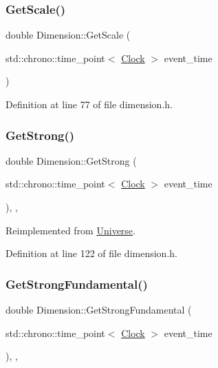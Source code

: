 \subsubsection{\texorpdfstring{Get\+Scale()}{GetScale()}}
{\footnotesize\ttfamily double Dimension\+::\+Get\+Scale (\begin{DoxyParamCaption}\item[{std\+::chrono\+::time\+\_\+point$<$ \hyperlink{universe_8h_a0ef8d951d1ca5ab3cfaf7ab4c7a6fd80}{Clock} $>$}]{event\+\_\+time }\end{DoxyParamCaption})\hspace{0.3cm}{\ttfamily [inline]}}



Definition at line 77 of file dimension.\+h.

\mbox{\label{class_dimension_ae36aadad4ae84735a5ff73bff4eb97b1}} 
\subsubsection{\texorpdfstring{Get\+Strong()}{GetStrong()}}
{\footnotesize\ttfamily double Dimension\+::\+Get\+Strong (\begin{DoxyParamCaption}\item[{std\+::chrono\+::time\+\_\+point$<$ \hyperlink{universe_8h_a0ef8d951d1ca5ab3cfaf7ab4c7a6fd80}{Clock} $>$}]{event\+\_\+time }\end{DoxyParamCaption})\hspace{0.3cm}{\ttfamily [inline]}, {\ttfamily [final]}, {\ttfamily [virtual]}}



Reimplemented from \hyperlink{class_universe_acb453ce71da418c5b5617fecede9571b}{Universe}.



Definition at line 122 of file dimension.\+h.

\mbox{\label{class_dimension_ad0d067d7f9dc4841b0ad280979ebe7af}} 
\subsubsection{\texorpdfstring{Get\+Strong\+Fundamental()}{GetStrongFundamental()}}
{\footnotesize\ttfamily double Dimension\+::\+Get\+Strong\+Fundamental (\begin{DoxyParamCaption}\item[{std\+::chrono\+::time\+\_\+point$<$ \hyperlink{universe_8h_a0ef8d951d1ca5ab3cfaf7ab4c7a6fd80}{Clock} $>$}]{event\+\_\+time }\end{DoxyParamCaption})\hspace{0.3cm}{\ttfamily [inline]}, {\ttfamily [final]}, {\ttfamily [virtual]}}



